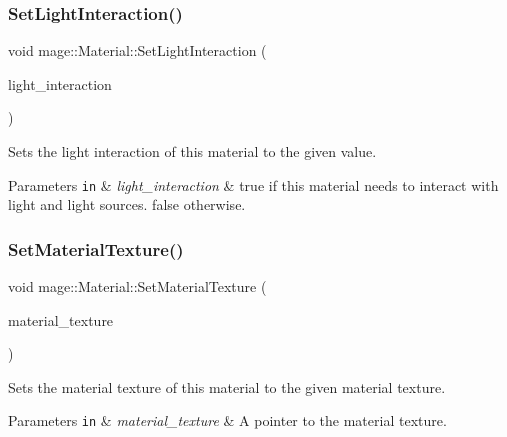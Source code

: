 \subsubsection{\texorpdfstring{Set\+Light\+Interaction()}{SetLightInteraction()}}
{\footnotesize\ttfamily void mage\+::\+Material\+::\+Set\+Light\+Interaction (\begin{DoxyParamCaption}\item[{bool}]{light\+\_\+interaction }\end{DoxyParamCaption})\hspace{0.3cm}{\ttfamily [noexcept]}}

Sets the light interaction of this material to the given value.


\begin{DoxyParams}[1]{Parameters}
\mbox{\tt in}  & {\em light\+\_\+interaction} & {\ttfamily true} if this material needs to interact with light and light sources. {\ttfamily false} otherwise. \\
\hline
\end{DoxyParams}
\hypertarget{classmage_1_1_material_a48f5f4576a998f8015b96f41e6c6c870}{}\label{classmage_1_1_material_a48f5f4576a998f8015b96f41e6c6c870} 
\subsubsection{\texorpdfstring{Set\+Material\+Texture()}{SetMaterialTexture()}}
{\footnotesize\ttfamily void mage\+::\+Material\+::\+Set\+Material\+Texture (\begin{DoxyParamCaption}\item[{\hyperlink{namespacemage_a1e01ae66713838a7a67d30e44c67703e}{Shared\+Ptr}$<$ const \hyperlink{classmage_1_1_texture}{Texture} $>$}]{material\+\_\+texture }\end{DoxyParamCaption})\hspace{0.3cm}{\ttfamily [noexcept]}}

Sets the material texture of this material to the given material texture.


\begin{DoxyParams}[1]{Parameters}
\mbox{\tt in}  & {\em material\+\_\+texture} & A pointer to the material texture. \\
\hline
\end{DoxyParams}
\hypertarget{classmage_1_1_material_a70dde310b2108e9ad3041df13db0bdc0}{}\label{classmage_1_1_material_a70dde310b2108e9ad3041df13db0bdc0} 
